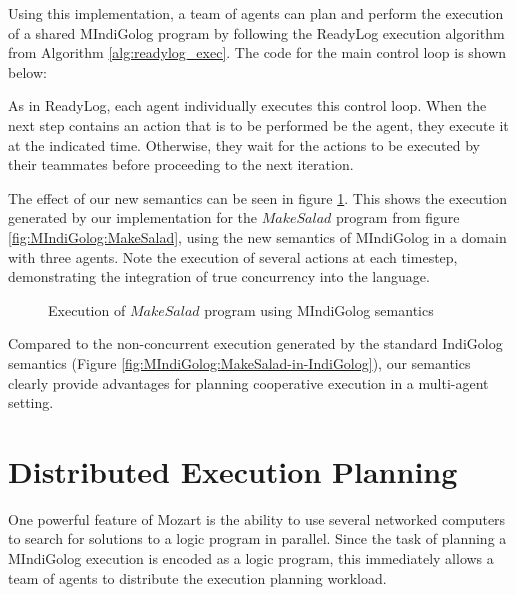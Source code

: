 
Using this implementation, a team of agents can plan and perform the
execution of a shared MIndiGolog program by following the ReadyLog
execution algorithm from Algorithm \ref{alg:readylog_exec}. The code
for the main control loop is shown below:


As in ReadyLog, each agent individually executes this control loop.
When the next step contains an action that is to be performed be the
agent, they execute it at the indicated time. Otherwise, they wait
for the actions to be executed by their teammates before proceeding
to the next iteration.

The effect of our new semantics can be seen in figure \ref{fig:MIndiGolog:MakeSalad-in-MIndiGolog}.
This shows the execution generated by our implementation for the $MakeSalad$
program from figure \ref{fig:MIndiGolog:MakeSalad}, using the new
semantics of MIndiGolog in a domain with three agents. Note the execution
of several actions at each timestep, demonstrating the integration
of true concurrency into the language.

%
\begin{figure}

\caption{Execution of $MakeSalad$ program using MIndiGolog semantics\label{fig:MIndiGolog:MakeSalad-in-MIndiGolog}}

\end{figure}


Compared to the non-concurrent execution generated by the standard
IndiGolog semantics (Figure \ref{fig:MIndiGolog:MakeSalad-in-IndiGolog}),
our semantics clearly provide advantages for planning cooperative
execution in a multi-agent setting.


\section{Distributed Execution Planning\label{sec:MIndiGolog:Distributed-Planning}}

One powerful feature of Mozart is the ability to use several networked
computers to search for solutions to a logic program in parallel.
Since the task of planning a MIndiGolog execution is encoded as a
logic program, this immediately allows a team of agents to distribute
the execution planning workload.

